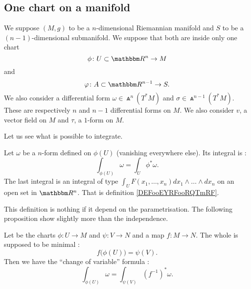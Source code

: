 \subsection{One chart on a manifold}

We suppose \( (M,g)\) to be a \( n\)-dimensional Riemannian manifold and \( S\) to be a \( (n-1)\)-dimensional submanifold. We suppose that both are inside only one chart
\begin{equation}
    \phi\colon U\subset \eR^n\to M
\end{equation}
and
\begin{equation}
    \varphi\colon A\subset \eR^{n-1}\to S.
\end{equation}
We also consider a differential form \( \omega\in \Wedge^n(T^*M)\) and \( \sigma\in\Wedge^{n-1}(T^*M)\). These are respectively \( n\) and \( n-1\) differential forms on \( M\).  We also consider \( v\), a vector field on \( M\) and \( \tau\), a \( 1\)-form on \(M\).

Let us see what is possible to integrate.

\begin{definition}       \label{DEFooPDRCooPiBklC}
    Let \( \omega\) be a \( n\)-form defined on \( \phi(U)\) (vanishing everywhere else). Its integral is :
    \begin{equation}
        \int_{\phi(U)}\omega=\int_U\phi^*\omega.
    \end{equation}
    The last integral is an integral of type \( \int_{U}F(x_1,\ldots, x_n)dx_1\wedge\ldots \wedge dx_n\) on an open set in \( \eR^n\). That is definition \ref{DEFooEYRFooRQTmRF}.
\end{definition}

This definition is nothing if it depend on the parametrisation. The following proposition show slightly more than the independence.
\begin{proposition}       \label{PROPooNJCLooMqeeeX}
    Let be the charts \( \phi\colon U\to M\) and \( \psi\colon V\to N\) and a map \( f\colon M\to N\). The whole is supposed to be minimal :
    \begin{equation}
        f\big( \phi(U) \big)=\psi(V).
    \end{equation}
    Then we have the ``change of variable'' formula :
    \begin{equation}
        \int_{\phi(U)}\omega=\int_{\psi(V)}(f^{-1})^*\omega.
    \end{equation}
\end{proposition}


